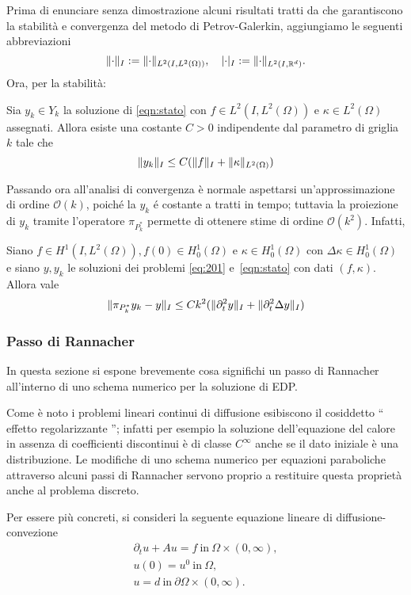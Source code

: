 Prima di enunciare senza dimostrazione alcuni risultati tratti da \cite{MAIN} che garantiscono la stabilità e convergenza del metodo di Petrov-Galerkin, aggiungiamo le seguenti abbreviazioni
\begin{equation}
\lVert\cdot\rVert_I:=\lVert\cdot\rVert_{L^2(I,L^2(\Omega))}, \quad \lvert \cdot \rvert_I:=\lVert\cdot\rVert_{L^2(I,\mathbb{R}^d)}.
\end{equation}
Ora, per la stabilità:
 \begin{lemma} 
 \label{stab:stato}
 Sia $y_k\in Y_k$ la soluzione di \eqref{eqn:stato} con $f\in L^2(I,L^2(\Omega))$ e $\kappa\in L^2(\Omega)$ assegnati. Allora esiste una costante $C>0$ indipendente dal parametro di griglia $k$ tale che
 \[
 \lVert y_k\rVert_I\le C(\lVert f\rVert_I + \lVert\kappa\rVert_{L^2(\Omega)})
 \]
\end{lemma}
 Passando ora all'analisi di convergenza è normale aspettarsi un'approssimazione di ordine $\mathcal{O}(k)$, poiché la $y_k$ é costante a tratti in tempo; tuttavia la proiezione di $y_k$ tramite l'operatore $\pi_{P^*_k}$ permette di ottenere stime di ordine $\mathcal{O}(k^2)$. Infatti,
 \begin{lemma} 
 \label{conv:stato}
 Siano $f\in H^1(I,L^2(\Omega)),f(0)\in H^1_0(\Omega)$ e $\kappa\in H^1_0(\Omega)$ con $\Delta\kappa\in H^1_0(\Omega)$ e siano $y,y_k$ le soluzioni dei problemi \ref{eq:201} e~\eqref{eqn:stato} con dati $(f,\kappa)$. Allora vale
 \[
 \lVert\pi_{P^*_k}y_k-y\rVert_I\le Ck^2(\lVert\partial^2_t y\rVert_I + \lVert\partial^2_t \Delta y\rVert_I)
 \]
 \end{lemma}
 
\subsubsection{Passo di Rannacher}
In questa sezione si espone brevemente cosa significhi un passo di Rannacher all'interno di uno schema numerico per la soluzione di EDP.

Come è noto i problemi lineari continui di diffusione esibiscono il cosiddetto `` effetto regolarizzante ''; infatti per esempio la soluzione dell'equazione del calore in assenza di coefficienti discontinui è di classe $ C^{\infty} $ anche se il dato iniziale è una distribuzione. Le modifiche di uno schema numerico per equazioni paraboliche attraverso alcuni passi di Rannacher servono proprio a restituire questa proprietà anche al problema discreto.

Per essere più concreti, si consideri la seguente equazione lineare di diffusione-convezione
\begin{gather}
\label{heat}
\partial_t u + Au=f \ \text{in}\ \Omega\times(0,\infty),  \\
u(0)=u^0 \ \text{in}\ \Omega, \\
u=d \ \text{in} \ \partial\Omega\times (0,\infty).
\end{gather}

